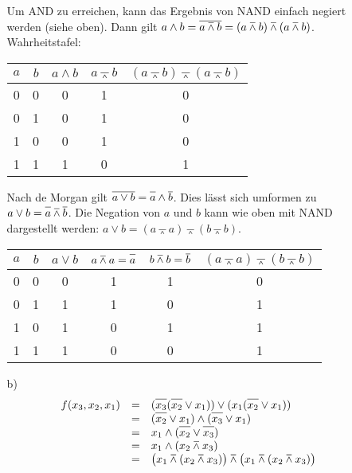 \documentclass[a4paper,10pt]{scrartcl}
\begin{document}
\begin{enumerate}
\begin{enumerate}
            Um AND zu erreichen, kann das Ergebnis von NAND einfach negiert werden (siehe oben). Dann gilt
            $a \wedge b = \oline{a \barwedge b} = (a \barwedge b) \barwedge (a \barwedge b)$. Wahrheitstafel:

            \hspace{1cm}\begin{tabular}[t]{c|c||c||c|c}
                $a$ & $b$ & $a \wedge b$ & $a \barwedge b$ & $(a \barwedge b) \barwedge (a \barwedge b)$  \\
                \hline
                0 & 0 & 0 & 1 & 0 \\
                0 & 1 & 0 & 1 & 0 \\
                1 & 0 & 0 & 1 & 0 \\
                1 & 1 & 1 & 0 & 1
            \end{tabular}

            Nach de Morgan gilt $\oline{a \vee b} = \oline{a} \wedge \oline{b}$. Dies
            lässt sich umformen zu $a \vee b = \oline{a} \barwedge \oline{b}$. Die Negation von $a$ und $b$
            kann wie oben mit NAND dargestellt werden: $a \vee b = (a \barwedge a) \barwedge (b \barwedge b)$.

            \hspace{1cm}\begin{tabular}[t]{c|c||c||c|c|c}
                $a$ & $b$ & $a \vee b$ & $a \barwedge a = \oline{a}$ & $b \barwedge b = \oline{b}$ & $(a \barwedge a) \barwedge (b \barwedge b)$  \\
                \hline
                0 & 0 & 0 & 1 & 1 & 0 \\
                0 & 1 & 1 & 1 & 0 & 1 \\
                1 & 0 & 1 & 0 & 1 & 1 \\
                1 & 1 & 1 & 0 & 0 & 1
            \end{tabular}

        \item[b)]
            $$\begin{array}{rcl}
                f(x_3, x_2, x_1)
                &=& (\oline{x_3}(\oline{x_2} \vee x_1)) \vee (x_1 ( \oline{x_2} \vee x_1 ) )\\
                &=& (\oline{x_2} \vee x_1) \wedge (\oline{x_3} \vee x_1)\\
                &=& x_1 \wedge (\oline{x_2} \vee \oline{x_3})\\
                &=& x_1 \wedge (x_2 \barwedge x_3)\\
                &=& \big(x_1 \barwedge (x_2 \barwedge x_3)\big) \barwedge \big(x_1 \barwedge (x_2 \barwedge x_3)\big)
            \end{array}$$


\end{enumerate}
\end{enumerate}
\end{document}
